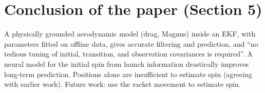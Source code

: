 \documentclass[11pt,a4paper]{article}
\begin{document}
\section{Conclusion of the paper (Section 5)}
A physically grounded aerodynamic model (drag, Magnus) inside an EKF, with parameters fitted on offline data, gives accurate filtering and prediction, and ``no tedious tuning of initial, transition, and observation covariances is required''.
A neural model for the initial spin from launch information drastically improves long-term prediction. Positions alone are insufficient to estimate spin (agreeing with earlier work). Future work: use the racket movement to estimate spin.

\end{document}
